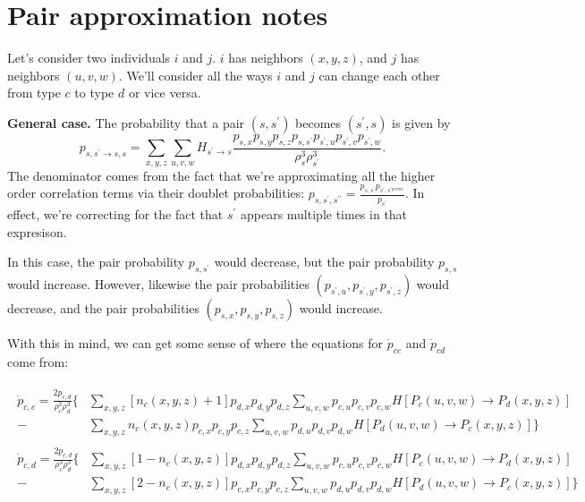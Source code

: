 \documentclass[13pt]{amsart}
\begin{document}
\section*{Pair approximation notes}

Let's consider two individuals $i$ and $j$.
$i$ has neighbors $(x, y, z)$, and $j$ has neighbors $(u, v, w)$.
We'll consider all the ways $i$ and $j$ can change each other from type $c$ to type $d$ or vice versa.

\textbf{General case.}
The probability that a pair $(s, s^\prime)$ becomes $(s^\prime, s)$ is given by
\begin{equation}
  p_{s,s^\prime \to s, s} = \sum_{x,y,z} \sum_{u,v,w} H_{s^\prime \to s} \frac{p_{s,x}p_{s,y}p_{s,z} p_{s,s^\prime} p_{s^\prime,u} p_{s^\prime,v} p_{s^\prime,w}}{\rho_s^3 \rho_{s^\prime}^3}.
\end{equation}
The denominator comes from the fact that we're approximating all the higher order correlation terms via their doublet probabilities: $p_{s,s^\prime,s^{\prime \prime}} = \frac{p_{s,s^\prime}p_{s^\prime, s^{\prime prime}}}{p_{s^\prime}}$.
In effect, we're correcting for the fact that $s^\prime$ appears multiple times in that expresison.

In this case, the pair probability $p_{s,s^\prime}$ would decrease, but the pair probability $p_{s,s}$ would increase.
However, likewise the pair probabilities $(p_{s^\prime,u}, p_{s^\prime,y}, p_{s^\prime,z})$ would decrease, and the pair probabilities $(p_{s,x}, p_{s,y}, p_{s,z})$ would increase.

With this in mind, we can get some sense of where the equations for $\dot{p}_{cc}$ and $\dot{p}_{cd}$ come from:

\begin{align}
    \begin{split}
        \label{eq:p_cc}
        \dot{p}_{c,c} =
        \frac{2p_{c,d}}{\rho_c^3 \rho_d^3} \bigg\{ & \sum_{x,y,z} \left[n_c (x,y,z) + 1 \right] p_{d,x} p_{d,y} p_{d,z}
        \sum_{u,v,w} p_{c,u} p_{c,v} p_{c,w} H \left[ P_c (u,v,w) \to P_d (x,y,z) \right] \\
            - & \sum_{x,y,z} n_c(x,y,z) p_{c,x} p_{c,y} p_{c,z}
        \sum_{u,v,w} p_{d,u} p_{d,v} p_{d,w} H \left[ P_d (u,v,w) \to P_c (x,y,z) \right] \bigg\}
    \end{split}
    \\
    \begin{split}
        \label{eq:p_cd}
        \dot{p}_{c,d}  =
        \frac{2p_{c,d}}{\rho_c^3 \rho_d^3} \bigg\{ & \sum_{x,y,z} \left[1 - n_c (x,y,z)\right] p_{d,x} p_{d,y} p_{d,z}
        \sum_{u,v,w} p_{c,u} p_{c,v} p_{c,w} H \left[ P_c (u,v,w) \to P_d (x,y,z) \right] \\
            - & \sum_{x,y,z} \left[ 2 - n_c(x,y,z) \right] p_{c,x} p_{c,y} p_{c,z}
        \sum_{u,v,w} p_{d,u} p_{d,v} p_{d,w} H \left[ P_d (u,v,w) \to P_c (x,y,z) \right] \bigg\}
    \end{split}
\end{align}
\end{document}
